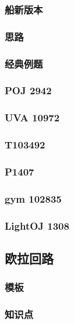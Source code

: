 \documentclass[10pt,a4paper]{article}
\begin{document}
\subsubsection{船新版本}

\subsubsection{思路}

\subsubsection{经典例题}

\subsubsection{POJ 2942}

\subsubsection{UVA 10972}

\subsubsection{T103492}

\subsubsection{P1407}

\subsubsection{gym 102835}

\subsubsection{LightOJ 1308}

\subsection{欧拉回路}
\subsubsection{模板}

\subsubsection{知识点}

\end{document}
